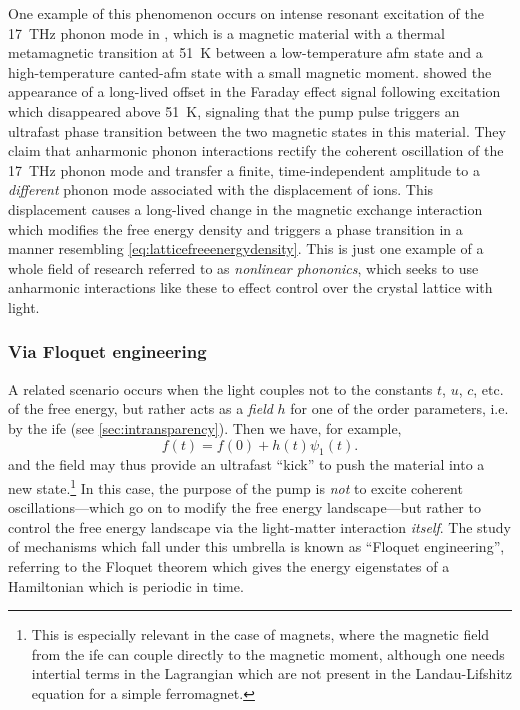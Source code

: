 One example of this phenomenon occurs on intense resonant excitation of the \qty{17}{THz} phonon mode in , which is a magnetic material with a thermal metamagnetic transition at \qty{51}{K} between a low-temperature \gls{afm} state and a high-temperature canted-\gls{afm} state with a small magnetic moment.
 showed the appearance of a long-lived offset in the Faraday effect signal following excitation which disappeared above \qty{51}{K}, signaling that the pump pulse triggers an ultrafast phase transition between the two magnetic states in this material.
They claim that anharmonic phonon interactions rectify the coherent oscillation of the \qty{17}{THz} phonon mode and transfer a finite, time-independent amplitude to a \emph{different} phonon mode associated with the displacement of  ions.
This displacement causes a long-lived change in the magnetic exchange interaction which modifies the free energy density and triggers a phase transition in a manner resembling \cref{eq:latticefreeenergydensity}.
This is just one example of a whole field of research referred to as \emph{nonlinear phononics}\citep{forst_nonlinear_2011}, which seeks to use anharmonic interactions like these to effect control over the crystal lattice with light.

\subsubsection{Via Floquet engineering}

A related scenario occurs when the light couples not to the constants $t$, $u$, $c$, etc. of the free energy, but rather acts as a \emph{field} $h$ for one of the order parameters, i.e. by the \gls{ife} (see \cref{sec:intransparency}).
Then we have, for example,
\begin{equation}
f(t) = f(0)+h(t)\psi_1(t).
\end{equation}
and the field may thus provide an ultrafast ``kick'' to push the material into a new state.\footnote{This is especially relevant in the case of magnets, where the magnetic field from the \gls{ife} can couple directly to the magnetic moment, although one needs intertial terms in the Lagrangian which are not present in the Landau-Lifshitz equation for a simple ferromagnet\citep{kimel_inertia-driven_2009}.}
In this case, the purpose of the pump is \emph{not} to excite coherent oscillations---which go on to modify the free energy landscape---but rather to control the free energy landscape via the light-matter interaction \emph{itself}.
The study of mechanisms which fall under this umbrella is known as ``Floquet engineering''\citep{oka_floquet_2019}, referring to the Floquet theorem\citep{shirley_solution_1965} which gives the energy eigenstates of a Hamiltonian which is periodic in time.

